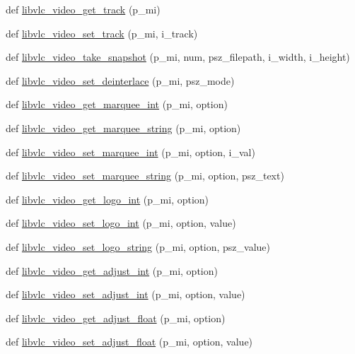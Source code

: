 \begin{DoxyCompactItemize}
def \hyperlink{namespacevlc_a0f6ee7f1555386407042f47c88cef65d}{libvlc\+\_\+video\+\_\+get\+\_\+track} (p\+\_\+mi)
\item 
def \hyperlink{namespacevlc_a5a93e0861484a0b67acaf7e76601edcb}{libvlc\+\_\+video\+\_\+set\+\_\+track} (p\+\_\+mi, i\+\_\+track)
\item 
def \hyperlink{namespacevlc_a0c671a906d1cdfe68ca7e1cb644a3bee}{libvlc\+\_\+video\+\_\+take\+\_\+snapshot} (p\+\_\+mi, num, psz\+\_\+filepath, i\+\_\+width, i\+\_\+height)
\item 
def \hyperlink{namespacevlc_a32c28e8b47f625bc8dc4a3634548fe65}{libvlc\+\_\+video\+\_\+set\+\_\+deinterlace} (p\+\_\+mi, psz\+\_\+mode)
\item 
def \hyperlink{namespacevlc_a401766594b9c4244e6a0d82f41bb197d}{libvlc\+\_\+video\+\_\+get\+\_\+marquee\+\_\+int} (p\+\_\+mi, option)
\item 
def \hyperlink{namespacevlc_ac9f15587fc7e277e517c65164b9bdf6f}{libvlc\+\_\+video\+\_\+get\+\_\+marquee\+\_\+string} (p\+\_\+mi, option)
\item 
def \hyperlink{namespacevlc_ae19a8b8caacacd5289023bee28ccff47}{libvlc\+\_\+video\+\_\+set\+\_\+marquee\+\_\+int} (p\+\_\+mi, option, i\+\_\+val)
\item 
def \hyperlink{namespacevlc_a820aaf1f58ece503b1e97ca798c8f117}{libvlc\+\_\+video\+\_\+set\+\_\+marquee\+\_\+string} (p\+\_\+mi, option, psz\+\_\+text)
\item 
def \hyperlink{namespacevlc_a3b3d43d9f8102e847bc0ecc9c7bf734d}{libvlc\+\_\+video\+\_\+get\+\_\+logo\+\_\+int} (p\+\_\+mi, option)
\item 
def \hyperlink{namespacevlc_a08e6d3ec08615034c79b7692c3048aa5}{libvlc\+\_\+video\+\_\+set\+\_\+logo\+\_\+int} (p\+\_\+mi, option, value)
\item 
def \hyperlink{namespacevlc_a20561b3917572011df2fb28924f6160c}{libvlc\+\_\+video\+\_\+set\+\_\+logo\+\_\+string} (p\+\_\+mi, option, psz\+\_\+value)
\item 
def \hyperlink{namespacevlc_ab0a3bb5f8036e686a3dedc3703aa7c06}{libvlc\+\_\+video\+\_\+get\+\_\+adjust\+\_\+int} (p\+\_\+mi, option)
\item 
def \hyperlink{namespacevlc_ad26714380b95c5d52496d67b570860ee}{libvlc\+\_\+video\+\_\+set\+\_\+adjust\+\_\+int} (p\+\_\+mi, option, value)
\item 
def \hyperlink{namespacevlc_af6b4ba880f091b003978517c9ef566cb}{libvlc\+\_\+video\+\_\+get\+\_\+adjust\+\_\+float} (p\+\_\+mi, option)
\item 
def \hyperlink{namespacevlc_ae64d6c4f5dad0c6b67e7eae0b4e1d2e3}{libvlc\+\_\+video\+\_\+set\+\_\+adjust\+\_\+float} (p\+\_\+mi, option, value)

\end{DoxyCompactItemize}

